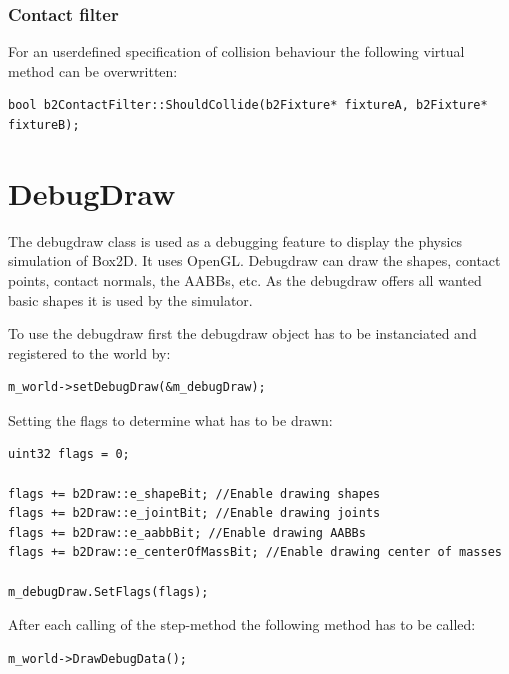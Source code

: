 \documentclass[10pt,a4paper,DIV=11]{scrreprt}
\begin{document}
\subsubsection*{Contact filter}
For an userdefined specification of collision behaviour the following virtual method can be overwritten: \\
\begin{lstlisting}[caption={The contact filter method},label=lst:box2d-contactfiler]
bool b2ContactFilter::ShouldCollide(b2Fixture* fixtureA, b2Fixture* fixtureB);
\end{lstlisting}


\section{DebugDraw}
The debugdraw class is used as a debugging feature to display the physics simulation of Box2D. It uses OpenGL. Debugdraw can draw the shapes, contact points, contact normals, the AABBs, etc.
As the debugdraw offers all wanted basic shapes it is used by the simulator.

To use the debugdraw first the debugdraw object has to be instanciated and registered to the world by: \\

\begin{lstlisting}[caption={Registering a debugdraw instance to the world instance},label=lst:box2d-ddrawset]
m_world->setDebugDraw(&m_debugDraw);
\end{lstlisting}

Setting the flags to determine what has to be drawn:

\begin{lstlisting}[caption={Initializing DebugDraw},label=lst:box2d-ddrawinit]
uint32 flags = 0;

flags += b2Draw::e_shapeBit; //Enable drawing shapes
flags += b2Draw::e_jointBit; //Enable drawing joints
flags += b2Draw::e_aabbBit; //Enable drawing AABBs
flags += b2Draw::e_centerOfMassBit; //Enable drawing center of masses

m_debugDraw.SetFlags(flags);
\end{lstlisting}


After each calling of the step-method the following method has to be called: \\

\begin{lstlisting}[caption={Using debugdraw after each step},label=lst:box2d-ddraw]
m_world->DrawDebugData();
\end{lstlisting}
\end{document}
